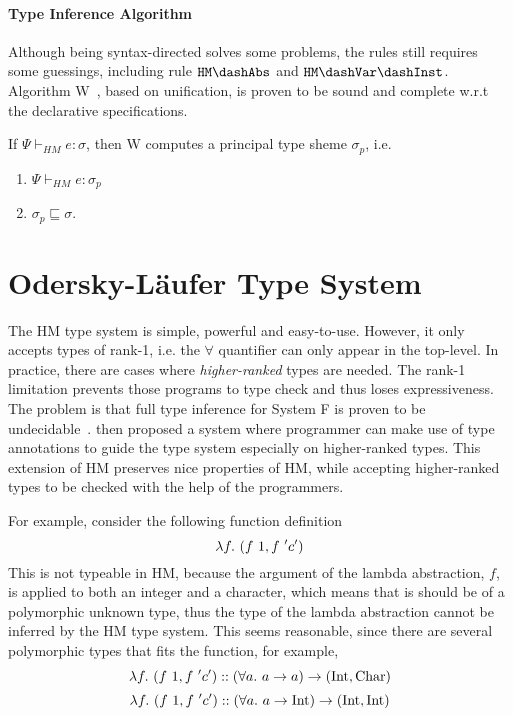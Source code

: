 \paragraph{Type Inference Algorithm}
Although being syntax-directed solves some problems, the rules still requires some guessings,
including rule $\mathtt{HM \dash Abs}$ and $\mathtt{HM \dash Var \dash Inst}$.
Algorithm W~\citep{milner1978theory}, based on unification,
is proven to be sound and complete w.r.t the declarative specifications.

\begin{theorem}
    If $\Psi \vdash_{HM} e : \sigma$, then W computes a principal type sheme $\sigma_p$, i.e.
    \begin{enumerate}
        \item $\Psi \vdash_{HM} e : \sigma_p$
        \item $\sigma_p \sqsubseteq \sigma$.
    \end{enumerate}
\end{theorem}




\section{Odersky-L\"aufer Type System}\label{sec:bg:ol}

The HM type system is simple, powerful and easy-to-use.
However, it only accepts types of rank-1, i.e. the $\forall$
quantifier can only appear in the top-level.
In practice, there are cases where \emph{higher-ranked} types are needed.
The rank-1 limitation prevents those programs to type check and thus loses expressiveness.
The problem is that full type inference for System F
is proven to be undecidable~\citep{wells1999typability}.
\citet{odersky1996putting} then proposed a system where programmer can
make use of type annotations to guide the type system especially on higher-ranked types.
This extension of HM preserves nice properties of HM,
while accepting higher-ranked types to be checked with the help of the programmers.

For example, consider the following function definition
$$\lam[f] (f~1, f~'c')$$
This is not typeable in HM, because the argument of the lambda abstraction, $f$,
is applied to both an integer and a character,
which means that is should be of a polymorphic unknown type,
thus the type of the lambda abstraction cannot be inferred by the HM type system.
This seems reasonable, since there are several polymorphic types that fits the function,
for example,
$$\lam[f] (f~1, f~'c') :: (\all a \to a) \to (\text{Int}, \text{Char})$$
$$\lam[f] (f~1, f~'c') :: (\all a \to \text{Int}) \to (\text{Int}, \text{Int})$$

